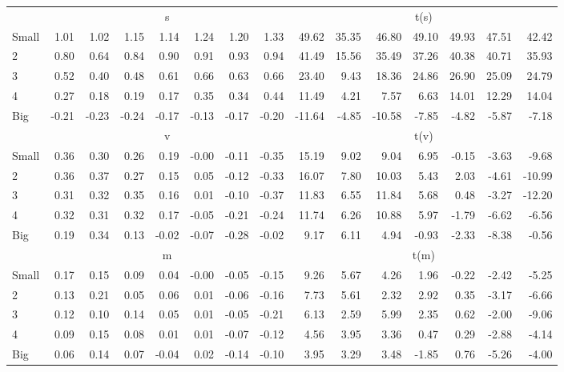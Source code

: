 \begin{table}[!ht]
\begin{tabular}{lrrrrrrrrrrrrrr}
  
     & \multicolumn{7}{c}{s} & \multicolumn{7}{c}{t(s)}   \\
     \cmidrule(r){2-8} \cmidrule(r){9-15} 
    Small  & 1.01  & 1.02  & 1.15  & 1.14  & 1.24  & 1.20  & 1.33  & 49.62  & 35.35  & 46.80  & 49.10  & 49.93  & 47.51  & 42.42   \\
    2  & 0.80  & 0.64  & 0.84  & 0.90  & 0.91  & 0.93  & 0.94  & 41.49  & 15.56  & 35.49  & 37.26  & 40.38  & 40.71  & 35.93   \\
    3  & 0.52  & 0.40  & 0.48  & 0.61  & 0.66  & 0.63  & 0.66  & 23.40  & 9.43  & 18.36  & 24.86  & 26.90  & 25.09  & 24.79   \\
    4  & 0.27  & 0.18  & 0.19  & 0.17  & 0.35  & 0.34  & 0.44  & 11.49  & 4.21  & 7.57  & 6.63  & 14.01  & 12.29  & 14.04   \\
    Big  & -0.21  & -0.23  & -0.24  & -0.17  & -0.13  & -0.17  & -0.20  & -11.64  & -4.85  & -10.58  & -7.85  & -4.82  & -5.87  & -7.18   \\
    
  
     & \multicolumn{7}{c}{v} & \multicolumn{7}{c}{t(v)}   \\
     \cmidrule(r){2-8} \cmidrule(r){9-15} 
    Small  & 0.36  & 0.30  & 0.26  & 0.19  & -0.00  & -0.11  & -0.35  & 15.19  & 9.02  & 9.04  & 6.95  & -0.15  & -3.63  & -9.68   \\
    2  & 0.36  & 0.37  & 0.27  & 0.15  & 0.05  & -0.12  & -0.33  & 16.07  & 7.80  & 10.03  & 5.43  & 2.03  & -4.61  & -10.99   \\
    3  & 0.31  & 0.32  & 0.35  & 0.16  & 0.01  & -0.10  & -0.37  & 11.83  & 6.55  & 11.84  & 5.68  & 0.48  & -3.27  & -12.20   \\
    4  & 0.32  & 0.31  & 0.32  & 0.17  & -0.05  & -0.21  & -0.24  & 11.74  & 6.26  & 10.88  & 5.97  & -1.79  & -6.62  & -6.56   \\
    Big  & 0.19  & 0.34  & 0.13  & -0.02  & -0.07  & -0.28  & -0.02  & 9.17  & 6.11  & 4.94  & -0.93  & -2.33  & -8.38  & -0.56   \\
    
  
     & \multicolumn{7}{c}{m} & \multicolumn{7}{c}{t(m)}   \\
     \cmidrule(r){2-8} \cmidrule(r){9-15} 
    Small  & 0.17  & 0.15  & 0.09  & 0.04  & -0.00  & -0.05  & -0.15  & 9.26  & 5.67  & 4.26  & 1.96  & -0.22  & -2.42  & -5.25   \\
    2  & 0.13  & 0.21  & 0.05  & 0.06  & 0.01  & -0.06  & -0.16  & 7.73  & 5.61  & 2.32  & 2.92  & 0.35  & -3.17  & -6.66   \\
    3  & 0.12  & 0.10  & 0.14  & 0.05  & 0.01  & -0.05  & -0.21  & 6.13  & 2.59  & 5.99  & 2.35  & 0.62  & -2.00  & -9.06   \\
    4  & 0.09  & 0.15  & 0.08  & 0.01  & 0.01  & -0.07  & -0.12  & 4.56  & 3.95  & 3.36  & 0.47  & 0.29  & -2.88  & -4.14   \\
    Big  & 0.06  & 0.14  & 0.07  & -0.04  & 0.02  & -0.14  & -0.10  & 3.95  & 3.29  & 3.48  & -1.85  & 0.76  & -5.26  & -4.00   \\
    

\end{tabular}
\end{table}
